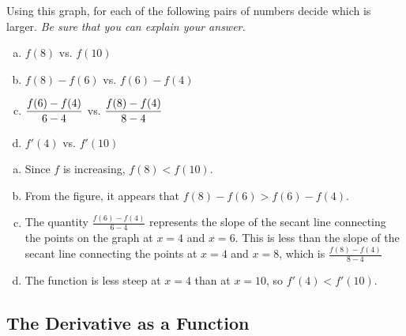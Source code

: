 \begin{enumerate}[1.]
\begin{multicols}{2}
\begin{Question}
\begin{center}
\end{center} 
\par 
Using this graph, for each of the following pairs of numbers
decide which is larger.  {\it Be sure that you can explain your
answer.} 
\par 
\begin{enumerate}[(a)]
\item
\(f(8)\) vs. \(f(10)\)
\item
\(f(8) - f(6)\) vs. \(f(6) - f(4)\)
\item
\(\displaystyle \frac{f(6) - f(4)}{6 - 4}\)
  vs.
  \(\displaystyle \frac{f(8) - f(4)}{8 - 4}\)
\item
\(f'(4)\) vs. \(f'(10)\)
\end{enumerate}
\par  \end{Question}
\begin{Solution}
\begin{enumerate}[(a)] 
\item
Since \(f\) is increasing,
\(f(8) < f(10)\).
\item
From the figure, it appears that
\(f(8) - f(6) > f(6) - f(4)\).
\item
The quantity \(\frac{f(6)-f(4)}{6-4}\)
represents the slope of the secant line connecting the points on the graph
at \(x=4\) and \(x=6\). This is less than the slope of the
secant line connecting the points at \(x=4\) and \(x=8\), which
is \(\frac{f(8)-f(4)}{8-4}\)
\item
The function is less steep at \(x=4\) than at \(x=10\), so
\(f'(4) < f'(10)\).
\end{enumerate}
\par\end{Solution}
\end{multicols}



\hrulefill
\subsection*{The Derivative as a Function}


\end{enumerate}
